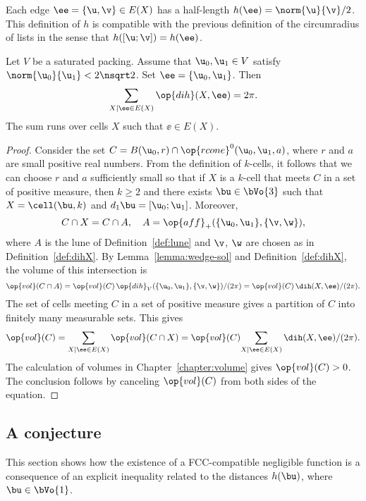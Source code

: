 \begin{cnl}
Each
edge $\ee=\braced{ \u, \v}\in E(X)$ has a half-length
$h(\ee) = \norm{ \u}{ \v}/2$.
This definition of $h$ is compatible with the previous definition of the circumradius
of lists in the sense that
$h([\u;\v]) = h(\ee)$.

\begin{lemma}
%
Let $V$ be a saturated packing.  Assume that $\u_0,\u_1\in V$ satisfy
$\norm{\u_0}{\u_1}<2\nsqrt2$.  Set $\ee=\braced{\u_0,\u_1}$.  Then
\[
\sumfinitepred{X}{X\mid \ee\in E(X) }{\op{dih}(X,\ee)} = 2\pi.
\]
The sum runs over cells $X$ such that $\ee\in E(X)$.
\end{lemma}

\begin{proof} 
  Consider the set $C=\openBall{\u_0}{r}\cap \op{rcone}^0(\u_0,\u_1,a)$, where
  $r$ and $a$ are small positive real numbers.  From the definition of
  $k$-cells, it follows that we can choose $r$ and $a$ sufficiently
  small so that if $X$ is a $k$-cell that meets $C$ in a set of
  positive measure, then $k\ge 2$ and there exists $\bu\in \bVo{3}$
  such that $X=\cell(\bu,k)$ and $d_1\bu=[\u_0;\u_1]$.  Moreover,
\[
C\cap X = C\cap A, \quad A=\op{aff}_+(\braced{\u_0,\u_1},\braced{\v,\w}),
\]
where $A$ is the lune of Definition~\ref{def:lune} and $\v$, $\w$ are
chosen as in Definition~\ref{def:dihX}.  By
Lemma~\ref{lemma:wedge-sol} and Definition~\ref{def:dihX}, the volume
of this intersection is
\[
\op{vol}(C\cap A) = \op{vol}(C)\,
 {\op{dih}_V(\braced{\u_0,\u_1},\braced{\v,\w}) }/{(2\pi)} =
  \op{vol}(C)\, {\dih(X,\ee)}/{(2\pi)}.
\]
The set of cells meeting $C$ in a set of positive measure gives a 
partition of $C$ into finitely many measurable sets.
This gives
\[
\op{vol}(C) = \sumfinitepred{X}{\sumvar{X}\ee\in E(X)}{\op{vol}(C\cap X)}  = 
\op{vol}(C)\sumfinitepred{X}{\sumvar{X} \ee\in E(X)}{ \dih(X,\ee)/(2\pi)}.
\]
The calculation of volumes in Chapter~\ref{chapter:volume} gives
$\op{vol}(C)>0$.  The conclusion follows by canceling $\op{vol}(C)$
from both sides of the equation.
\end{proof}







\subsection{A conjecture}\label{A conjecture}

This section shows how the existence of a FCC-compatible negligible
function is a consequence of an explicit
inequality related to the distances $h(\bu)$, where $\bu\in \bVo{1}$.


\end{cnl}
